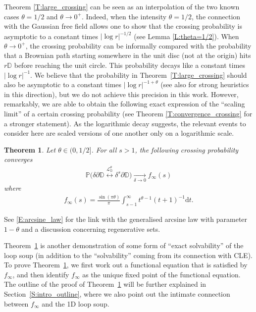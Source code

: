 \documentclass[11pt]{article}
\newtheorem{theorem}{Theorem}[section]
\theoremstyle{remark}
\newcommand{\D}{\mathbb{D}}
\newcommand{\Lc}{\mathcal{L}}
\renewcommand{\P}{\mathbb{P}}
\renewcommand{\d}{\mathrm{d}}
\numberwithin{equation}{section}
\begin{document}
Theorem \ref{T:large_crossing} can be seen as an interpolation of the two known cases $\theta =1/2$ and $\theta \to 0^+$. Indeed, when the intensity $\theta = 1/2$, the connection with the Gaussian free field allows one to show that the crossing probability is asymptotic to a constant times $|\log r|^{-1/2}$ (see Lemma \ref{L:theta=1/2}).
When $\theta \to 0^+$, the crossing probability can be informally compared with the probability that a Brownian path starting somewhere in the unit disc (not at the origin)
hits $r \D$ before reaching the unit circle. This probability decays like a constant times $|\log r|^{-1}$.
We believe that the probability in Theorem~\ref{T:large_crossing} should also be asymptotic to a constant times $|\log r|^{-1+\theta}$ (see also \cite[Section 9.5]{JLQ23b} for strong heuristics in this direction), but we do not achieve this precision in this work. However, remarkably, we are able to obtain the following exact expression of the ``scaling limit'' of a certain crossing probability (see Theorem \ref{T:convergence_crossing} for a stronger statement).
As the logarithmic decay suggests, the relevant events to consider here are scaled versions of one another only on a logarithmic scale.

\begin{theorem}\label{T:intro_convergence_crossing}
Let $\theta \in (0,1/2]$.
For all $s >1$, the following crossing probability converges
\begin{align}\label{eq:convergence_crossing}
\P \Big( \delta \partial \D \overset{\Lc_\D^\theta}{\longleftrightarrow} \delta^s \partial \D \Big)
\xrightarrow[\delta \to 0]{} f_\infty(s)
\end{align}
where 
\begin{align}\label{eq:f_infty}
 f_\infty(s)= \frac{\sin(\pi \theta)}{\pi} \int_{s-1}^\infty t^{\theta-1} (t+1)^{-1} \d t.
\end{align}
\end{theorem}

See \eqref{E:arcsine_law} for the link with the generalised arcsine law with parameter $1-\theta$ and a discussion concerning regenerative sets.

Theorem~\ref{T:intro_convergence_crossing} is another demonstration of some form of ``exact solvability'' of the loop soup (in addition to the ``solvability'' coming from its connection with CLE). To prove Theorem~\ref{T:intro_convergence_crossing}, we first work out a functional equation that is satisfied by $f_\infty$, and then identify $f_\infty$ as the unique fixed point of the functional equation.
The outline of the proof of Theorem~\ref{T:intro_convergence_crossing} will be further explained in Section~\ref{S:intro_outline}, where we also point out the intimate connection between $f_\infty$ and the 1D loop soup.
\end{document}
